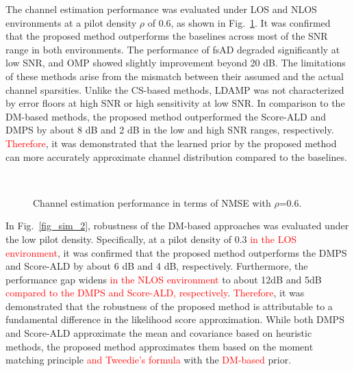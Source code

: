 \documentclass[lettersize,journal]{IEEEtran}
\newcommand{\tred}{\textcolor{red}}
\begin{document}
The channel estimation performance was evaluated under LOS and NLOS environments at a pilot density $\rho$ of 0.6, as shown in Fig.~\ref{fig_sim_1}. It was confirmed that the proposed method outperforms the baselines across most of the SNR range in both environments. The performance of fsAD degraded significantly at low SNR, and OMP showed slightly improvement beyond 20 dB. The limitations of these methods arise from the mismatch between their assumed and the actual channel sparsities. Unlike the CS-based methods, LDAMP was not characterized by error floors at high SNR or high sensitivity at low SNR. In comparison to the DM-based methods, the proposed method outperformed the Score-ALD and DMPS by about 8 dB and 2 dB in the low and high SNR ranges, respectively. \tred{Therefore}, it was demonstrated that the learned prior by the proposed method can more accurately approximate channel distribution compared to the baselines.

\begin{figure}[!t]
\\
\caption{Channel estimation performance in terms of NMSE with $\rho$=0.6.}
\label{fig_sim_1}
\end{figure}

In Fig.~\ref{fig_sim_2}, robustness of the DM-based approaches was evaluated under the low pilot density. Specifically, at a pilot density of 0.3 \tred{in the LOS environment}, it was confirmed that the proposed method outperforms the DMPS and Score-ALD by about 6 dB and 4 dB, respectively. Furthermore, the performance gap widens \tred{in the NLOS environment} to about 12dB and 5dB \tred{compared to the DMPS and Score-ALD, respectively}. \tred{Therefore}, it was demonstrated that the robustness of the proposed method is attributable to a fundamental difference in the likelihood score approximation. While both DMPS and Score-ALD approximate the mean and covariance based on heuristic methods, the proposed method approximates them based on the moment matching principle \tred{and Tweedie's formula} with the \tred{DM-based} prior.
\end{document}
